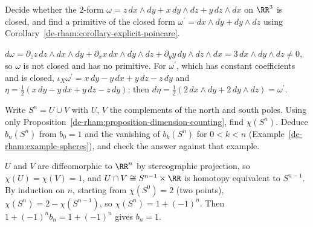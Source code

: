 \begin{exercise}\label{de-rham:exercise-explicit-primitive}
Decide whether the $2$-form $\omega = z\,dx \wedge dy + x\,dy \wedge dz + y\,dz \wedge dx$ on $\RR^3$ is closed, and find a primitive of the closed form
$\omega^{\prime} = dx \wedge dy + dy \wedge dz$ using Corollary~\ref{de-rham:corollary-explicit-poincare}.
\end{exercise}

\begin{solution}
$d\omega = \partial_zz\,dz \wedge dx \wedge dy + \partial_xx\,dx \wedge dy \wedge dz + \partial_yy\,dy \wedge dz \wedge dx = 3\,dx \wedge dy \wedge dz \neq 0$, so $\omega$ is not closed and has no primitive.
For $\omega^{\prime}$, which has constant coefficients and is closed, $\iota_X\omega^{\prime} = x\,dy - y\,dx + y\,dz - z\,dy$ and $\eta = \frac12(x\,dy - y\,dx + y\,dz - z\,dy)$; then
$d\eta = \frac12(2\,dx \wedge dy + 2\,dy \wedge dz) = \omega^{\prime}$.
\end{solution}

\begin{exercise}\label{de-rham:exercise-spheres-euler}
Write $S^n = U \cup V$ with $U$, $V$ the complements of the north and south poles. Using only Proposition~\ref{de-rham:proposition-dimension-counting}, find $\chi(S^n)$. Deduce $b_n(S^n)$ from $b_0 = 1$ and the vanishing of
$b_k(S^n)$ for $0 < k < n$ (Example~\ref{de-rham:example-spheres}), and check the answer against that example.
\end{exercise}

\begin{solution}
$U$ and $V$ are diffeomorphic to $\RR^n$ by stereographic projection, so $\chi(U) = \chi(V) = 1$, and $U \cap V \cong S^{n-1} \times \RR$ is homotopy equivalent to $S^{n-1}$. By induction on $n$, starting from $\chi(S^0) = 2$
(two points), $\chi(S^n) = 2 - \chi(S^{n-1})$, so $\chi(S^n) = 1 + (-1)^n$. Then $1 + (-1)^nb_n = 1 + (-1)^n$ gives $b_n = 1$.
\end{solution}

